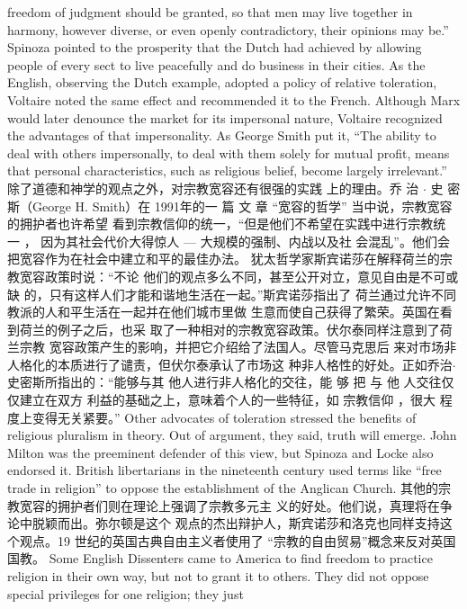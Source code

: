 \begin{paracol}{2}
freedom of judgment should be granted, so that men may live
together in harmony, however diverse, or even openly contradictory, their opinions may be.'' Spinoza pointed to the prosperity that the Dutch had achieved by allowing people of every
sect to live peacefully and do business in their cities. As the
English, observing the Dutch example, adopted a policy of relative toleration, Voltaire noted the same effect and recommended it to the French. Although Marx would later denounce
the market for its impersonal nature, Voltaire recognized the
advantages of that impersonality. As George Smith put it, ``The
ability to deal with others impersonally, to deal with them
solely for mutual profit, means that personal characteristics,
such as religious belief, become largely irrelevant.''
\switchcolumn
除了道德和神学的观点之外，对宗教宽容还有很强的实践
上的理由。乔 治 $\cdot$ 史 密 斯（George H. Smith）在 1991年的一
篇 文 章 “宽容的哲学” 当中说，宗教宽容的拥护者也许希望
看到宗教信仰的统一，“但是他们不希望在实践中进行宗教统
一 ， 因为其社会代价大得惊人 --- 大规模的强制、内战以及社
会混乱”。他们会把宽容作为在社会中建立和平的最佳办法。
犹太哲学家斯宾诺莎在解释荷兰的宗教宽容政策时说：“不论
他们的观点多么不同，甚至公开对立，意见自由是不可或缺
的，只有这样人们才能和谐地生活在一起。”斯宾诺莎指出了
荷兰通过允许不同教派的人和平生活在一起并在他们城市里做
生意而使自己获得了繁荣。英国在看到荷兰的例子之后，也采
取了一种相对的宗教宽容政策。伏尔泰同样注意到了荷兰宗教
宽容政策产生的影响，并把它介绍给了法国人。尽管马克思后
来对市场非人格化的本质进行了谴责，但伏尔泰承认了市场这
种非人格性的好处。正如乔治$\cdot$ 史密斯所指出的：“能够与其
他人进行非人格化的交往，能 够 把 与 他 人交往仅仅建立在双方
利益的基础之上，意味着个人的一些特征，如 宗教信仰 ，很大
程度上变得无关紧要。”
\switchcolumn*
Other advocates of toleration stressed the benefits of religious pluralism in theory. Out of argument, they said, truth
will emerge. John Milton was the preeminent defender of this
view, but Spinoza and Locke also endorsed it. British libertarians in the nineteenth century used terms like ``free trade in religion'' to oppose the establishment of the Anglican Church.
\switchcolumn
其他的宗教宽容的拥护者们则在理论上强调了宗教多元主
义的好处。他们说，真理将在争论中脱颖而出。弥尔顿是这个
观点的杰出辩护人，斯宾诺莎和洛克也同样支持这个观点。19
世纪的英国古典自由主义者使用了 “宗教的自由贸易”概念来反对英国国教。
\switchcolumn*
Some English Dissenters came to America to find freedom to
practice religion in their own way, but not to grant it to others.
They did not oppose special privileges for one religion; they just

\end{paracol}
